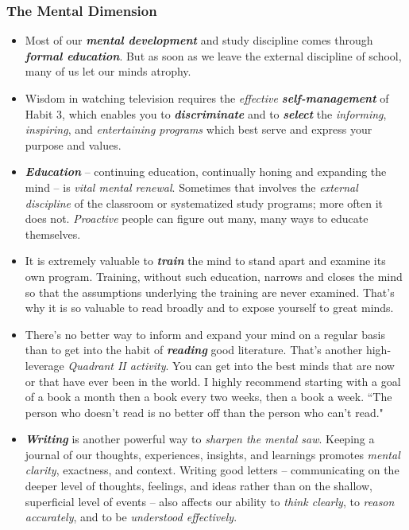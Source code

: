 \documentclass[11pt]{article}
\begin{document}
\subsubsection{The Mental Dimension}
\begin{itemize}
\item Most of our \emph{\textbf{mental development}} and study discipline comes through \emph{\textbf{formal education}}. But as soon as we leave the external discipline of school, many of us let our minds atrophy.

\item Wisdom in watching television requires the \emph{effective \textbf{self-management}} of Habit 3, which enables you to \emph{\textbf{discriminate}} and to \emph{\textbf{select}} the \emph{informing}, \emph{inspiring}, and \emph{entertaining programs} which best serve and express your purpose and values.

\item \emph{\textbf{Education}} -- continuing education, continually honing and expanding the mind -- is \emph{vital mental renewal}. Sometimes that involves the \emph{external discipline} of the classroom or systematized study programs; more often it does not. \emph{Proactive} people can figure out many, many ways to educate themselves.

\item It is extremely valuable to \emph{\textbf{train}} the mind to stand apart and examine its own program. Training, without such education, narrows and closes
the mind so that the assumptions underlying the training are never examined. That's why it is so valuable to read broadly and to expose yourself to great minds.

\item There's no better way to inform and expand your mind on a regular basis than to get into the habit of \emph{\textbf{reading}} good literature. That's another high-leverage \emph{Quadrant II activity}. You can get into the best minds that are now or that have ever been in the world. I highly recommend starting with a goal
of a book a month then a book every two weeks, then a book a week. ``The person who doesn't read is no better off than the person who can't read."

\item \emph{\textbf{Writing}} is another powerful way to \emph{sharpen the mental saw}. Keeping a journal of our thoughts, experiences, insights, and learnings promotes \emph{mental clarity}, exactness, and context. Writing good letters -- communicating on the deeper level of thoughts, feelings, and ideas rather than on the shallow, superficial level of events -- also affects our ability to \emph{think clearly}, to \emph{reason accurately}, and to be \emph{understood effectively}.


\end{itemize}
\end{document}
